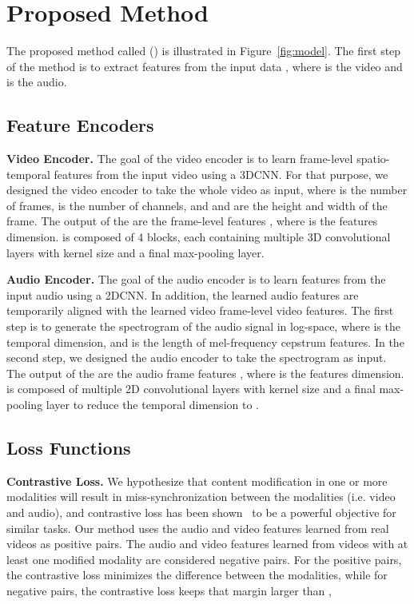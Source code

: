 \documentclass[conference, a4paper]{IEEEtran}
\makeatletter
\newcommand*{\ie}{i.e.\@\xspace}
\makeatother
\begin{document}
\section{Proposed Method}
\label{sec:proposed_method}
The proposed method called \model{} (\modelabbr{}) is illustrated in Figure~\ref{fig:model}. The first step of the method is to extract features from the input data , where  is the video and  is the audio.

\subsection{Feature Encoders}
\noindent \textbf{Video Encoder.} The goal of the video encoder is to learn frame-level spatio-temporal features from the input video  using a 3DCNN. For that purpose, we designed the video encoder  to take the whole video  as input, where  is the number of frames,  is the number of channels, and  and  are the height and width of the frame. The output of the  are the frame-level features , where  is the features dimension.  is composed of 4 blocks, each containing multiple 3D convolutional layers with kernel size  and a final max-pooling layer.

\noindent \textbf{Audio Encoder.} The goal of the audio encoder is to learn features from the input audio  using a 2DCNN. In addition, the learned audio features are temporarily aligned with the learned video frame-level video features. The first step is to generate the spectrogram  of the audio signal in log-space, where  is the temporal dimension, and  is the length of mel-frequency cepstrum features. In the second step, we designed the audio encoder  to take the spectrogram  as input. The output of the  are the audio frame features , where  is the features dimension.  is composed of multiple 2D convolutional layers with kernel size  and a final max-pooling layer to reduce the temporal dimension  to .

\subsection{Loss Functions}  
\noindent \textbf{Contrastive Loss.} We hypothesize that content modification in one or more modalities will result in miss-synchronization between the modalities (\ie video and audio), and contrastive loss has been shown~\cite{chung_out_2017, chugh_not_2020} to be a powerful objective for similar tasks. Our method uses the audio and video features learned from real videos as positive pairs. The audio and video features learned from videos with at least one modified modality are considered negative pairs. For the positive pairs, the contrastive loss minimizes the difference between the modalities, while for negative pairs, the contrastive loss keeps that margin larger than ,
\end{document}
